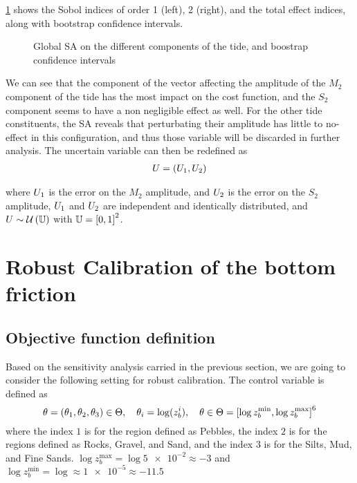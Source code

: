 \documentclass[../../Main_ManuscritThese.tex]{subfiles}
\newcommand{\zob}{z_b}
\newcommand\imgpath{/home/victor/acadwriting/Manuscrit/Text/Chapter5/img/}
\begin{document}
\cref{fig:SA_tides} shows the Sobol indices of order 1 (left), 2
(right), and the total effect indices, along with bootstrap confidence
intervals.
\begin{figure}[ht]
  \centering
  
  \caption{\label{fig:SA_tides} Global SA on the different components
    of the tide, and boostrap confidence intervals}
\end{figure}

We can see that the component of the vector affecting the amplitude of
the $M_2$ component of the tide has the most impact on the cost
function, and the $S_2$ component seems to have a non negligible
effect as well. For the other tide constituents, the SA reveals that
perturbating their amplitude has little to no-effect in this
configuration, and thus those variable will be discarded in further
analysis. The uncertain variable can then be redefined as
\begin{align}
  \UU = (\UU_1, \UU_2)%
\end{align}

where $U_1$ is the error on the $M_2$ amplitude, and $U_2$ is the
error on the $S_2$ amplitude, $U_1$ and $U_2$ are independent and
identically distributed, and
$U \sim \mathcal{U}\left(\mathbb{U}\right)$ with
$\Uspace = \interval{0}{1}^2$.

\clearpage
\section{Robust Calibration of the bottom friction}

\subsection{Objective function definition}

Based on the sensitivity analysis carried in the previous section, we
are going to consider the following setting for robust calibration.
The control variable is defined as
\begin{equation}
  \kk=\left(\kk_1,\kk_2,\kk_3\right) \in \Kspace, \quad \kk_i = \log(\zob^i), \quad \KK \in \Kspace = \interval{\log \zob^{\min}}{\log\zob^{\max}}^6
  \end{equation}
  where the index $1$ is for the region defined as Pebbles, the index
  $2$ is for the regions defined as Rocks, Gravel, and Sand, and the
  index $3$ is for the Silts, Mud, and Fine Sands. $\log\zob^{\max} = \log\num{5e-2} \approx -3$ and $\log \zob^{\min} = \log \approx \num{1e-5} \approx -11.5$
\end{document}
